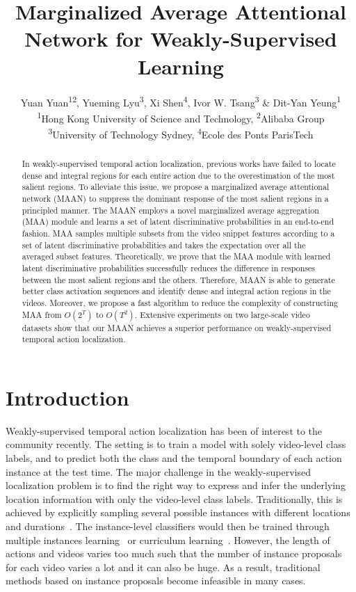 \documentclass{article} \usepackage{iclr2019_conference,times}
\title{Marginalized Average Attentional Network for Weakly-Supervised Learning}
\author{Yuan Yuan\textsuperscript{12}, Yueming Lyu\textsuperscript{3}, Xi Shen\textsuperscript{4}, Ivor W. Tsang\textsuperscript{3} \& Dit-Yan Yeung\textsuperscript{1} \\\textsuperscript{1}Hong Kong University of Science and Technology, \textsuperscript{2}Alibaba Group \\\textsuperscript{3}University of Technology Sydney, \textsuperscript{4}Ecole des Ponts ParisTech }
\begin{document}
\maketitle

\begin{abstract}
In weakly-supervised temporal action localization, previous works have failed to locate dense and integral regions for each entire action due to the overestimation of the most salient regions. To alleviate this issue, we propose a marginalized average attentional network (MAAN) to suppress the dominant response of the most salient regions in a principled manner. The MAAN employs a novel marginalized average aggregation (MAA) module and learns a set of latent discriminative probabilities in an end-to-end fashion. 
MAA samples multiple subsets from the video snippet features according to a set of latent discriminative probabilities and takes the expectation over all the averaged subset features.
Theoretically, we prove that the MAA module with learned latent discriminative probabilities successfully reduces the difference in responses between the most salient regions and the others.
Therefore, MAAN is able to generate better class activation sequences and identify dense and integral action regions in the videos. 
Moreover, we propose a fast algorithm to reduce the complexity of constructing MAA from $O(2^T)$ to $O(T^2)$. Extensive experiments on two large-scale video datasets show that our MAAN achieves a superior performance on weakly-supervised temporal action localization.


\end{abstract}



\section{Introduction}
Weakly-supervised temporal action localization has been of interest to the community recently. The setting is to train a model with solely video-level class labels, and to predict both the class and the temporal boundary of each action instance at the test time.
The major challenge in the weakly-supervised localization problem is to find the right way to express and infer the underlying location information with only the video-level class labels.
Traditionally, this is achieved by explicitly sampling several possible instances with different locations and durations~\citep{bilen2016weakly,kantorov2016contextlocnet,zhang2017co}. The instance-level classifiers would then be trained through multiple instances learning~\citep{cinbis2017weakly, yuan2017temporal} or curriculum learning~\citep{bengio2009curriculum}. 
However, the length of actions and videos varies too much such that the number of instance proposals for each video varies a lot and it can also be huge. As a result, traditional methods based on instance proposals become infeasible in many cases.
\end{document}
